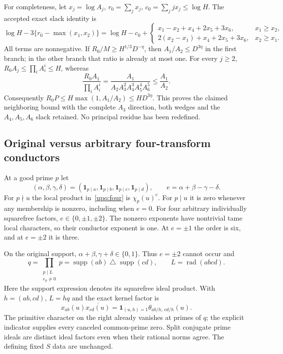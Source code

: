 For completeness, let $x_j=\log A_j$, $r_0=\sum_jx_j$,
$c_0=\sum_jjx_j\le\log H$. The accepted exact slack identity is
\[
 \log H-3\{r_0-\max(x_1,x_2)\}
 =\log H-c_0+
 \begin{cases}
 x_1-x_2+x_4+2x_5+3x_6,&x_1\ge x_2,\\
 2(x_2-x_1)+x_4+2x_5+3x_6,&x_2\ge x_1.
 \end{cases}
\]
All terms are nonnegative. If $R_0/M\ge H^{1/3}D^{-\eta}$, then
$A_1/A_2\le D^{3\eta}$ in the first branch; in the other branch that ratio
is already at most one. For every $j\ge2$,
$R_0A_j\le\prod_iA_i^i\le H$, whereas
\[
 \frac{R_0A_1}{\prod_iA_i^i}
 =\frac{A_1}{A_2A_3^2A_4^3A_5^4A_6^5}
 \le\frac{A_1}{A_2}.
\]
Consequently $R_0P\le H\max(1,A_1/A_2)\le HD^{3\eta}$.
This proves the claimed neighboring bound with the complete $A_3$
direction, both wedges and the $A_4,A_5,A_6$ slack retained.
No principal residue has been redefined.

\subsection{Original versus arbitrary four-transform conductors}
At a good prime $p$ let
\[
 (\alpha,\beta,\gamma,\delta)
 =(\mathbf1_{p\mid a},\mathbf1_{p\mid b},
   \mathbf1_{p\mid c},\mathbf1_{p\mid d}),\qquad
 e=\alpha+\beta-\gamma-\delta.
\]
For $p\nmid u$ the local product in~\eqref{upq:four} is
$\chi_p(u)^e$. For $p\mid u$ it is zero whenever any membership is
nonzero, including when $e=0$. For four arbitrary individually squarefree
factors, $e\in\{0,\pm1,\pm2\}$. The nonzero exponents have nontrivial tame
local characters, so their conductor exponent is one. At $e=\pm1$
the order is six, and at $e=\pm2$ it is three.

On the original support, $\alpha+\beta,\gamma+\delta\in\{0,1\}$.
Thus $e=\pm2$ cannot occur and
\[
 q=\prod_{\substack{p\mid L\\e_p\ne0}}p
   =\operatorname{supp}(ab)\mathbin{\triangle}
       \operatorname{supp}(cd),\qquad
 L=\operatorname{rad}(abcd).
\]
Here the support expression denotes its squarefree ideal product.
With $h=(ab,cd)$, $L=hq$ and the exact kernel factor is
\begin{equation}\label{upq:rawpair}
 x_{ab}(u)\overline{x_{cd}(u)}
 =\mathbf1_{(u,h)=1}\theta_{ab/h,\,cd/h}(u).
\end{equation}
The primitive character on the right already vanishes at primes of $q$;
the explicit indicator supplies every canceled common-prime zero.
Split conjugate prime ideals are distinct ideal factors even when their
rational norms agree. The defining fixed $S$ data are unchanged.

